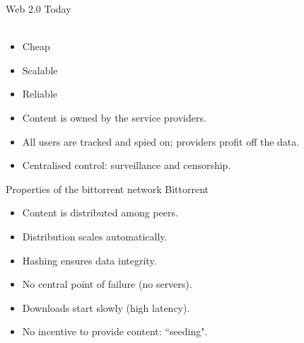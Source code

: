 \begin{frame}{Web 2.0}
 Today\\[5pt]
 \\
 \begin{itemize}
  \item<3-> Cheap 
  \item<6-> Scalable
  \item<7-> Reliable
 \end{itemize}
 \begin{itemize}
  \item<9-> Content is \alert<9>{owned by the service providers}.
  \item<10-> All users are \alert<10>{tracked and spied on}; providers profit off the data.
  \item<11-> Centralised control: \alert<11>{surveillance and censorship}.
 \end{itemize}
\pause
\end{frame}


\begin{frame}{Properties of the bittorrent network}
 Bittorrent\\
 \begin{itemize}
  \item<2-> Content is distributed among peers.
  \item<3-> Distribution scales automatically.
  \item<4-> Hashing ensures data integrity.
  \item<5-> No central point of failure (no servers).
 \end{itemize}
 \begin{itemize}
  \item<6-> Downloads start slowly (high latency).
  \item<7-> No incentive to provide content: ``seeding".
 \end{itemize}
\end{frame}

